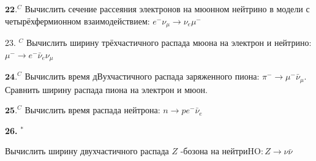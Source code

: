 \documentclass[a4paper,12pt]{article} %
\begin{document}
\begin{ttask}

$\mathbf{2 2 .}^{C}$ Вычислить сечение рассеяния электронов на мюонном нейтрино
в модели с четырёхфермионном взаимодействием: $e^{-} \nu_{\mu} \rightarrow \nu_{e} \mu^{-}$




































\end{ttask}



\begin{ttask}

23. $^{C}$ Вычислить ширину трёхчастичного распада мюона на электрон и нейтрино: $\mu^{-} \rightarrow e^{-} \bar{\nu}_{e} \nu_{\mu}$


\end{ttask}



\begin{ttask}

$\mathbf{2 4 .}^{C}$ Вычислить время дВухчастичного распада заряженного пиона:
$\pi^{-} \rightarrow \mu^{-} \bar{\nu}_{\mu} .$ Сравнить ширину распада пиона на электрон и мюон.



\end{ttask}



\begin{ttask}

$\mathbf{2 5 .}^{C}$ Вычислить время распада нейтрона: $n \rightarrow p e^{-} \bar{\nu}_{e}$


\end{ttask}



\begin{ttask}

\textbf{26. }$^{*}$ 




Вычислить ширину двухчастичного распада $Z$ -бозона на нейтри$\mathrm{HO}: Z \rightarrow \nu \bar{\nu}$


\end{ttask}
\end{document}
